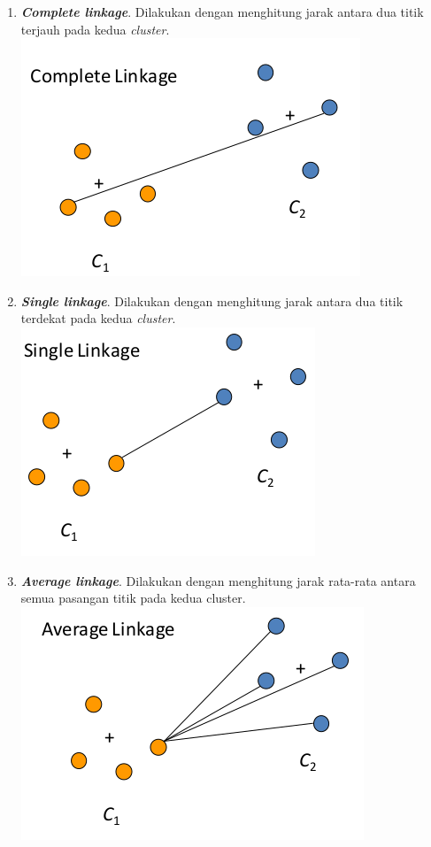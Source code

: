 \documentclass[11pt]{article}
\makeatletter
\def\maxwidth{\ifdim\Gin@nat@width>\linewidth\linewidth
    \else\Gin@nat@width\fi}
\let\Oldincludegraphics\includegraphics
\renewcommand{\includegraphics}[1]{\Oldincludegraphics[width=.8\maxwidth]{#1}}
\makeatother
\begin{document}
\begin{enumerate}
\def\labelenumi{\arabic{enumi}.}
\item
  \textbf{\emph{Complete linkage}}. Dilakukan dengan menghitung jarak
  antara dua titik terjauh pada kedua \emph{cluster}.
  \includegraphics{img/complete.png}
\item
  \textbf{\emph{Single linkage}}. Dilakukan dengan menghitung jarak
  antara dua titik terdekat pada kedua \emph{cluster}.
  \includegraphics{img/single.png}
\item
  \textbf{\emph{Average linkage}}. Dilakukan dengan menghitung jarak
  rata-rata antara semua pasangan titik pada kedua cluster.
  \includegraphics{img/average.png}

\end{enumerate}
\end{document}
